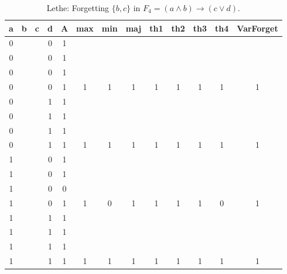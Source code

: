 \begin{table}[!tb]
    \centering
    \begin{tabular}{|c|c|c|c|c|c|c|c|c|c|c|c|c|}
        \hline
        \textbf{a} & \textbf{b} & \textbf{c} & \textbf{d} & \textbf{A} & \textbf{max} & \textbf{min} & \textbf{maj} & \textbf{th1} & \textbf{th2} & \textbf{th3} & \textbf{th4} & \textbf{VarForget} \\ \hline
        \rowcolor{gray!40} 0 &  &  & 0 & 1 &  &  &  &  &  &  &  &  \\ \hline
        \rowcolor{gray!40} 0 &  &  & 0 & 1 &  &  &  &  &  &  &  &  \\ \hline
        \rowcolor{gray!40} 0 &  &  & 0 & 1 &  &  &  &  &  &  &  &  \\ \hline
        \rowcolor{gray!40} 0 &  &  & 0 & 1 & 1 & 1 & 1 & 1 & 1 & 1 & 1 & 1 \\ \hline
        \rowcolor{blue!40} 0 &  &  & 1 & 1 &  &  &  &  &  &  &  &  \\ \hline
        \rowcolor{blue!40} 0 &  &  & 1 & 1 &  &  &  &  &  &  &  &  \\ \hline
        \rowcolor{blue!40} 0 &  &  & 1 & 1 &  &  &  &  &  &  &  &  \\ \hline
        \rowcolor{blue!40} 0 &  &  & 1 & 1 & 1 & 1 & 1 & 1 & 1 & 1 & 1 & 1 \\ \hline
        \rowcolor{red!40} 1 &  &  & 0 & 1 &  &  &  &  &  &  &  &  \\ \hline
        \rowcolor{red!40} 1 &  &  & 0 & 1 &  &  &  &  &  &  &  &  \\ \hline
        \rowcolor{red!40} 1 &  &  & 0 & 0 &  &  &  &  &  &  &  &  \\ \hline
        \rowcolor{red!40} 1 &  &  & 0 & 1 & 1 & 0 & 1 & 1 & 1 & 1 & 0 & 1 \\ \hline
        \rowcolor{green!40} 1 &  &  & 1 & 1 &  &  &  &  &  &  &  &  \\ \hline
        \rowcolor{green!40} 1 &  &  & 1 & 1 &  &  &  &  &  &  &  &  \\ \hline
        \rowcolor{green!40} 1 &  &  & 1 & 1 &  &  &  &  &  &  &  &  \\ \hline
        \rowcolor{green!40} 1 &  &  & 1 & 1 & 1 & 1 & 1 & 1 & 1 & 1 & 1 & 1 \\ \hline
    \end{tabular}
    \caption{Lethe: Forgetting $\{b, c\}$ in $F_{4} = (a \land b) \rightarrow (c \lor d)$.}
    \label{tab:lethe-F4-bc}
\end{table}
